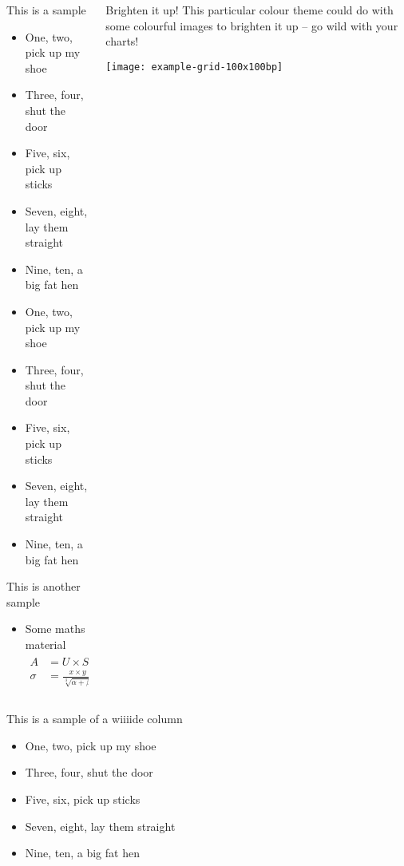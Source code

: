 \documentclass{beamer}
\begin{document}
\begin{frame}[fragile]
\begin{columns}[T]
\begin{column}{.3\textwidth}
\begin{block}{This is a sample}
\begin{itemize}
\item One, two, pick up my shoe
\item Three, four, shut the door
\item Five, six, pick up sticks
\item Seven, eight, lay them straight
\item Nine, ten, a big fat hen
\item One, two, pick up my shoe
\item Three, four, shut the door
\item Five, six, pick up sticks
\item Seven, eight, lay them straight
\item Nine, ten, a big fat hen
\end{itemize}
\end{block}


\begin{block}{This is another sample}
\begin{itemize}
\item Some maths material
\begin{align}
A &= U \times S \times V^T\\
\sigma &= \frac{x\times y}{\sqrt[3]{\alpha + \beta}}
\end{align}
\end{itemize}
\end{block}
\end{column}

\begin{column}{.33\textwidth}
\begin{block}{Brighten it up!}
This particular colour theme could do with some colourful images to brighten it up -- go wild with your charts!

\begin{center}
\texttt{[image: example-grid-100x100bp]}
\end{center}

\end{block}
\end{column}

\end{columns}

\begin{block}{This is a sample of a wiiiide column}
\begin{itemize}
\item One, two, pick up my shoe
\item Three, four, shut the door
\item Five, six, pick up sticks
\item Seven, eight, lay them straight
\item Nine, ten, a big fat hen
\end{itemize}
\end{block}


\end{frame}
\end{document}
